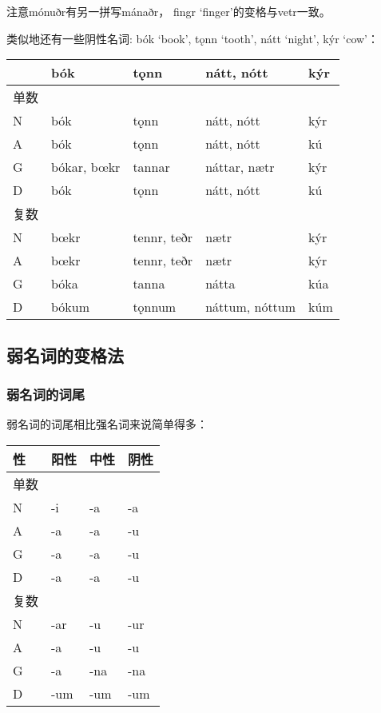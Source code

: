注意mónuðr有另一拼写mánaðr， fingr `finger‌'的变格与vetr一致。

类似地还有一些阴性名词: bók `book', tǫnn `tooth', nátt `night', kýr
`cow'：

\begin{longtable}{lllll}
\toprule
 & bók & tǫnn & nátt, nótt & kýr \\
\midrule
\endhead
\bottomrule
\endfoot
单数 & & & & \\
N & bók & tǫnn & nátt, nótt & kýr \\
A & bók & tǫnn & nátt, nótt & kú \\
G & bókar, bœkr & tannar & náttar, nætr & kýr \\
D & bók & tǫnn & nátt, nótt & kú \\
复数 & & & & \\
N & bœkr & tennr, teðr & nætr & kýr \\
A & bœkr & tennr, teðr & nætr & kýr \\
G & bóka & tanna & nátta & kúa \\
D & bókum & tǫnnum & náttum, nóttum & kúm \\
\end{longtable}

\subsection{弱名词的变格法}\label{ux5f31ux540dux8bcdux7684ux53d8ux683cux6cd5}

\subsubsection{弱名词的词尾}\label{ux5f31ux540dux8bcdux7684ux8bcdux5c3e}

弱名词的词尾相比强名词来说简单得多：

\begin{longtable}{llll}
\toprule
性 & 阳性 & 中性 & 阴性 \\
\midrule
\endhead
\bottomrule
\endfoot
单数 & & & \\
N & -i & -a & -a \\
A & -a & -a & -u \\
G & -a & -a & -u \\
D & -a & -a & -u \\
复数 & & & \\
N & -ar & -u & -ur \\
A & -a & -u & -u \\
G & -a & -na & -na \\
D & -um & -um & -um \\
\end{longtable}


